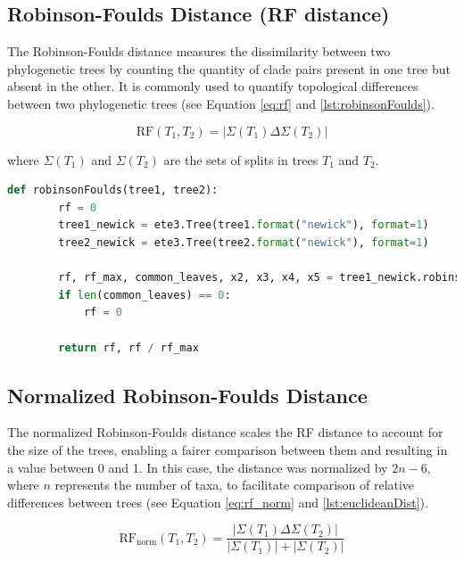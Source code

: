 \subsection{Robinson-Foulds Distance (RF distance)}\label{RF}
The Robinson-Foulds distance measures the dissimilarity between two phylogenetic trees by counting the quantity of clade pairs present in one tree but absent in the other. It is commonly used to quantify topological differences between two phylogenetic trees (see Equation \eqref{eq:rf} and \autoref{lst:robinsonFoulds}).

\begin{equation}\label{eq:rf}
    \text{RF}(T_1, T_2) = | \Sigma(T_1) \Delta \Sigma(T_2) |
\end{equation}

where $\Sigma(T_1)$ and $\Sigma(T_2)$ are the sets of splits in trees $T_1$ and $T_2$.

\begin{lstlisting}[label=lst:robinsonFoulds,language=Python,caption=Python script for calculating the Robinson-Foulds distance using the ete3 package in the aPhyloGeo package]
    def robinsonFoulds(tree1, tree2):
        rf = 0
        tree1_newick = ete3.Tree(tree1.format("newick"), format=1)
        tree2_newick = ete3.Tree(tree2.format("newick"), format=1)

        rf, rf_max, common_leaves, x2, x3, x4, x5 = tree1_newick.robinson_foulds(tree2_newick, unrooted_trees=True)
        if len(common_leaves) == 0:
            rf = 0

        return rf, rf / rf_max
\end{lstlisting}


\subsection{Normalized Robinson-Foulds Distance}\label{RFnorm}
The normalized Robinson-Foulds distance scales the RF distance to account for the size of the trees, enabling a fairer comparison between them and resulting in a value between 0 and 1. In this case, the distance was normalized by $2n-6$, where $n$ represents the number of taxa, to facilitate comparison of relative differences between trees (see Equation \eqref{eq:rf_norm} and \autoref{lst:euclideanDist}).

\begin{equation}\label{eq:rf_norm}
    \text{RF}_{\text{norm}}(T_1, T_2) = \frac{| \Sigma(T_1) \Delta \Sigma(T_2) |}{| \Sigma(T_1) | + | \Sigma(T_2) |}
\end{equation}


